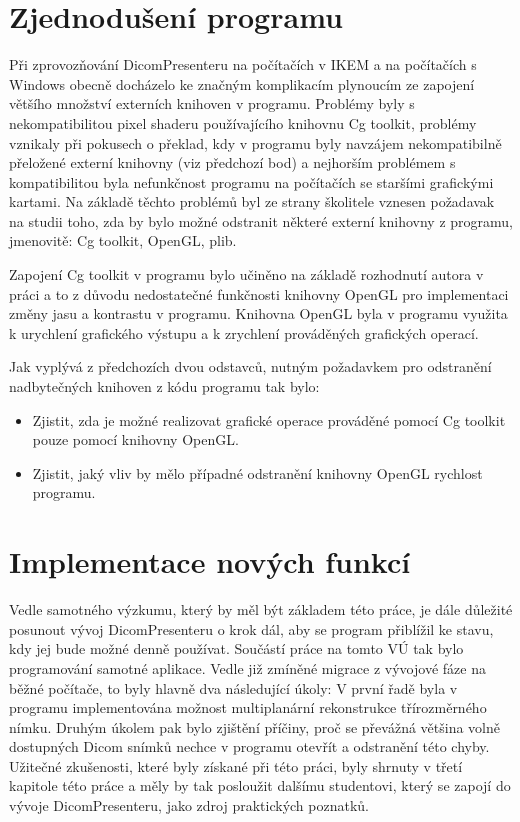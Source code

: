 \section*{Zjednodušení programu}
Při zprovozňování DicomPresenteru na počítačích v IKEM a na počítačích s Windows obecně docházelo ke značným komplikacím plynoucím ze zapojení většího množství externích knihoven v programu. Problémy byly s nekompatibilitou pixel shaderu používajícího knihovnu Cg toolkit, problémy vznikaly při pokusech o překlad, kdy v programu byly navzájem nekompatibilně přeložené externí knihovny (viz předchozí bod) a nejhorším problémem s kompatibilitou byla nefunkčnost programu na počítačích se staršími grafickými kartami. Na základě těchto problémů byl ze strany školitele vznesen požadavak na studii toho, zda by bylo možné odstranit některé externí knihovny z programu, jmenovitě: Cg toolkit, OpenGL, plib.

Zapojení Cg toolkit v programu bylo učiněno na základě rozhodnutí autora v práci \cite{neskudla} a to z důvodu nedostatečné funkčnosti knihovny OpenGL pro implementaci změny jasu a kontrastu v programu. Knihovna OpenGL byla v programu využita k urychlení grafického výstupu a k zrychlení prováděných grafických operací.

Jak vyplývá z předchozích dvou odstavců, nutným požadavkem pro odstranění nadbytečných knihoven z kódu programu tak bylo:

\begin{itemize}
\item Zjistit, zda je možné realizovat grafické operace prováděné pomocí Cg toolkit pouze pomocí knihovny OpenGL.
\item Zjistit, jaký vliv by mělo případné odstranění knihovny OpenGL rychlost programu.
\end{itemize}


\section*{Implementace nových funkcí}
Vedle samotného výzkumu, který by měl být základem této práce, je dále důležité posunout vývoj DicomPresenteru o krok dál, aby se program přiblížil ke stavu, kdy jej bude možné denně používat. Součástí práce na tomto VÚ tak bylo programování samotné aplikace. Vedle již zmíněné migrace z vývojové fáze na běžné počítače, to byly hlavně dva následující úkoly: V první řadě byla v programu implementována možnost multiplanární rekonstrukce třírozměrného nímku. Druhým úkolem pak bylo zjištění příčiny, proč se převážná většina volně dostupných Dicom snímků nechce v programu otevřít a odstranění této chyby. Užitečné zkušenosti, které byly získané při této práci, byly shrnuty v třetí kapitole této práce a měly by tak posloužit dalšímu studentovi, který se zapojí do vývoje DicomPresenteru, jako zdroj praktických poznatků.
